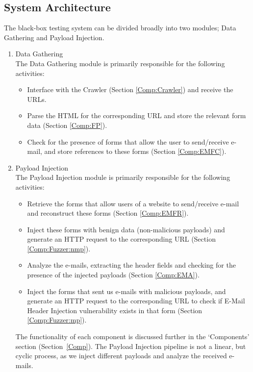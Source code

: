 \subsection{System Architecture}
\label{sys:arch}
The black-box testing system can be divided broadly into two modules; Data Gathering and Payload Injection.
\begin{enumerate}
	\item Data Gathering\\
	The Data Gathering module is primarily responsible for the following activities:
	\begin{itemize}
		\item Interface with the Crawler (Section \ref{Comp:Crawler}) and receive the URLs.
		\item Parse the HTML for the corresponding URL and store the relevant form data (Section \ref{Comp:FP}).
		\item Check for the presence of forms that allow the user to send/receive e-mail, and store references to these forms (Section \ref{Comp:EMFC}).
	\end{itemize} 
	\item Payload Injection\\
	The Payload Injection module is primarily responsible for the following activities:
	\begin{itemize}
		\item Retrieve the forms that allow users of a website to send/receive e-mail and reconstruct these forms (Section \ref{Comp:EMFR}).
		\item Inject these forms with benign data (non-malicious payloads) and generate an HTTP request to the corresponding URL (Section \ref{Comp:Fuzzer:nmp}).
		\item Analyze the e-mails, extracting the header fields and checking for the presence of the injected payloads (Section \ref{Comp:EMA}).
		\item Inject the forms that sent us e-mails with malicious payloads, and generate an HTTP request to the corresponding URL to check if E-Mail Header Injection vulnerability exists in that form (Section \ref{Comp:Fuzzer:mp}).
	\end{itemize} 
	The functionality of each component is discussed further in the `Components' section (Section~\ref{Comp}). The Payload Injection pipeline is not a linear, but cyclic process, as we inject different payloads and analyze the received e-mails.
\end{enumerate}

